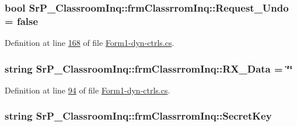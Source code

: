 \hypertarget{class_sr_p___classroom_inq_1_1frm_classrrom_inq_acb5bab8dcbcbfc8ed7a5b260ddba84e3}{
\subsubsection[{\-Request\-\_\-\-Undo}]{\setlength{\rightskip}{0pt plus 5cm}bool {\bf \-Sr\-P\-\_\-\-Classroom\-Inq\-::frm\-Classrrom\-Inq\-::\-Request\-\_\-\-Undo} = false}}
\label{class_sr_p___classroom_inq_1_1frm_classrrom_inq_acb5bab8dcbcbfc8ed7a5b260ddba84e3}


\-Definition at line \hyperlink{_form1-dyn-ctrls_8cs_source_l00168}{168} of file \hyperlink{_form1-dyn-ctrls_8cs_source}{\-Form1-\/dyn-\/ctrls.\-cs}.

\hypertarget{class_sr_p___classroom_inq_1_1frm_classrrom_inq_ab11c567168df8023b691c4adf4a149ad}{
\subsubsection[{\-R\-X\-\_\-\-Data}]{\setlength{\rightskip}{0pt plus 5cm}string {\bf \-Sr\-P\-\_\-\-Classroom\-Inq\-::frm\-Classrrom\-Inq\-::\-R\-X\-\_\-\-Data} = \char`\"{}\char`\"{}}}
\label{class_sr_p___classroom_inq_1_1frm_classrrom_inq_ab11c567168df8023b691c4adf4a149ad}


\-Definition at line \hyperlink{_form1-dyn-ctrls_8cs_source_l00094}{94} of file \hyperlink{_form1-dyn-ctrls_8cs_source}{\-Form1-\/dyn-\/ctrls.\-cs}.

\hypertarget{class_sr_p___classroom_inq_1_1frm_classrrom_inq_ae3ddacd233e71c710d89e12401af37c1}{
\subsubsection[{\-Secret\-Key}]{\setlength{\rightskip}{0pt plus 5cm}string {\bf \-Sr\-P\-\_\-\-Classroom\-Inq\-::frm\-Classrrom\-Inq\-::\-Secret\-Key}}}
\label{class_sr_p___classroom_inq_1_1frm_classrrom_inq_ae3ddacd233e71c710d89e12401af37c1}


